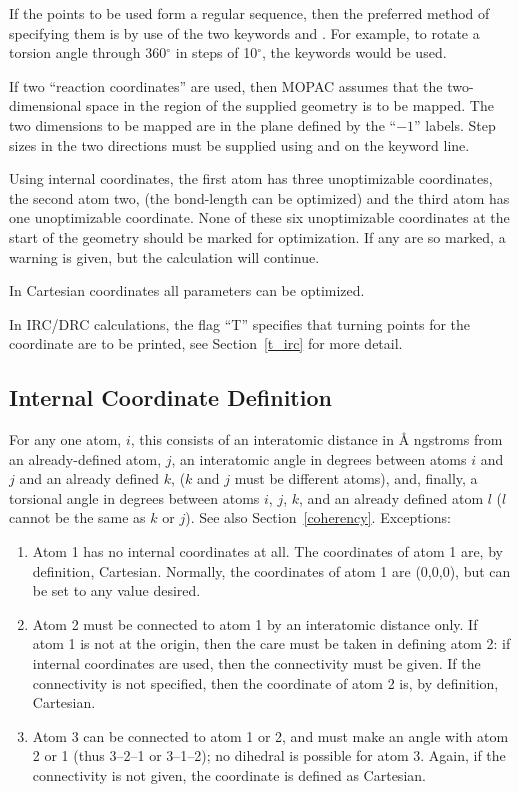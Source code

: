 If the points to be used form a regular sequence, then the preferred method
of specifying them is by use of the two keywords  and .
For example, to rotate a torsion angle through 360$^\circ$ in steps of 10$^\circ$,
the keywords  would be used.

If two ``reaction coordinates'' are used, then MOPAC assumes that  the
two-dimensional  space  in  the  region of the supplied geometry is to be
mapped.  The two dimensions to be mapped are in the plane defined by  the
``$-1$'' labels. Step  sizes  in the two directions must be supplied using
 and  on the keyword line.

Using internal coordinates, the first atom has  three  unoptimizable
coordinates,  the second atom two, (the bond-length can be optimized) and the
third atom has one  unoptimizable  coordinate.   None  of  these  six
unoptimizable  coordinates  at the start of the geometry should be marked for
optimization.  If any are so marked, a  warning  is  given,  but  the
calculation will continue.

In Cartesian coordinates all parameters can be optimized.

In IRC/DRC calculations, the flag ``T'' specifies that turning points for the
coordinate are to be printed, see Section~\ref{t_irc} for more detail.

\subsection{Internal Coordinate Definition}\label{int}
For any one atom, $i$, this consists of  an  interatomic  distance  in \AA
ngstroms  from  an  already-defined  atom, $j$,  an interatomic angle in
degrees between atoms $i$ and $j$ and an  already defined $k$, ($k$ and $j$
must  be different  atoms), and, finally, a torsional angle in degrees between
atoms $i$, $j$, $k$, and an already defined atom $l$ ($l$  cannot be the same
as $k$ or  $j$). See also Section~\ref{coherency}. Exceptions:

\begin{enumerate}
\item Atom 1 has no internal coordinates at all.  The coordinates of
atom 1 are, by definition, Cartesian.  Normally, the coordinates of atom
1 are (0,0,0), but can be set to any value desired.
\item Atom 2 must be connected to atom 1 by  an  interatomic  distance
only. If atom 1 is not at the origin, then the care must be taken in defining
atom 2: if internal coordinates are used, then the connectivity must be
given.  If the connectivity is not specified, then the coordinate of atom
2 is, by definition, Cartesian.
\item Atom 3 can be connected to atom 1 or 2, and must make  an  angle
with  atom  2  or  1  (thus  3--2--1  or 3--1--2); no dihedral is
possible for atom 3.  Again, if the connectivity is not given, the
coordinate is defined as Cartesian.
\end{enumerate}

